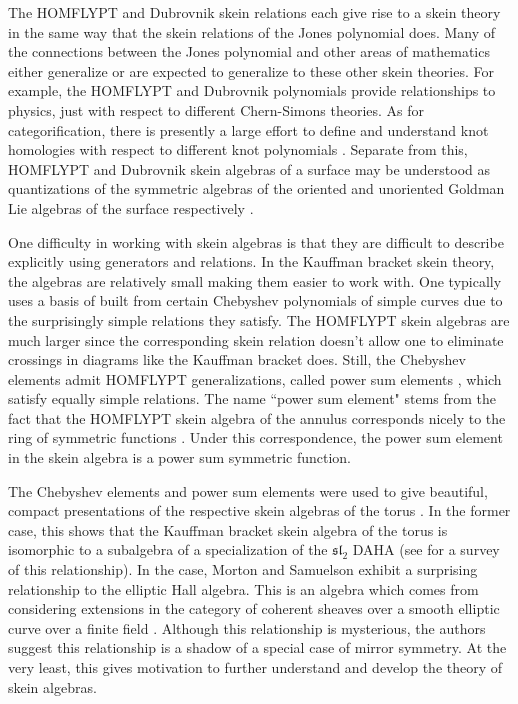 The HOMFLYPT and Dubrovnik skein relations each give rise to a skein theory in the same way that the skein relations of the Jones polynomial does. Many of the connections between the Jones polynomial and other areas of mathematics either generalize or are expected to generalize to these other skein theories. For example, the HOMFLYPT and Dubrovnik polynomials provide relationships to physics, just with respect to different Chern-Simons theories. As for categorification, there is presently a large effort to define and understand knot homologies with respect to different knot polynomials \cite{KR08, Web17}. Separate from this, HOMFLYPT and Dubrovnik skein algebras of a surface may be understood as quantizations of the symmetric algebras of the oriented and unoriented Goldman Lie algebras of the surface respectively \cite{Tur91}. 

One difficulty in working with skein algebras is that they are difficult to describe explicitly using generators and relations. In the Kauffman bracket skein theory, the algebras are relatively small making them easier to work with. One typically uses a basis of built from certain Chebyshev polynomials of simple curves due to the surprisingly simple relations they satisfy. The HOMFLYPT skein algebras are much larger since the corresponding skein relation doesn't allow one to eliminate crossings in diagrams like the Kauffman bracket does. Still, the Chebyshev elements admit HOMFLYPT generalizations, called power sum elements \cite{Mor02b}, which satisfy equally simple relations. The name ``power sum element" stems from the fact that the HOMFLYPT skein algebra of the annulus corresponds nicely to the ring of symmetric functions \cite{Luk05}. Under this correspondence, the power sum element in the skein algebra is a power sum symmetric function. 

The Chebyshev elements and power sum elements were used to give beautiful, compact presentations of the respective skein algebras of the torus \cite{FG00, MS17}. In the former case, this shows that the Kauffman bracket skein algebra of the torus is isomorphic to a subalgebra of a specialization of the $\mathfrak{sl}_2$ DAHA (see \cite{MS21} for a survey of this relationship). In the case, Morton and Samuelson exhibit a surprising relationship to the elliptic Hall algebra. This is an algebra which comes from considering extensions in the category of coherent sheaves over a smooth elliptic curve over a finite field \cite{BS12}. Although this relationship is mysterious, the authors suggest this relationship is a shadow of a special case of mirror symmetry. At the very least, this gives motivation to further understand and develop the theory of skein algebras.

